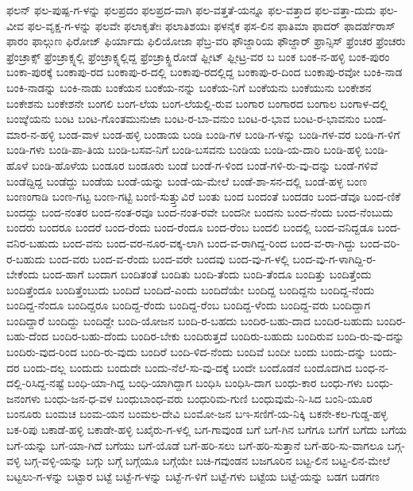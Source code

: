 ಫಲನ್
ಫಲ-ಪುಷ್ಪ-ಗ-ಳನ್ನು
ಫಲಪ್ರದಂ
ಫಲಪ್ರದ-ವಾಗಿ
ಫಲ-ವತ್ತತೆ-ಯನ್ನೂ
ಫಲ-ವತ್ತಾದ
ಫಲ-ವತ್ತಾ-ದುದು
ಫಲ-ವೀವ
ಫಲ-ವೃಕ್ಷ-ಗ-ಳನ್ನು
ಫಲವೇ
ಫಲಾಕೃತೇಃ
ಫಲಾತಿಶಯಃ
ಫಳನೈಕ
ಫಸ-ಲಿನ
ಫಾತಿಮಾ
ಫಾದರ್
ಫಾದರ್ಹೆರಾಸ್
ಫಾರಂ
ಫಾಲ್ಗುಣ
ಫಿರೋಜ್
ಫಿರ್ಯಾದು
ಫಿಲಿಯೋಜಾ
ಫೆಬ್ರ-ವರಿ
ಫೌಜ್ದಾರಿಯ
ಫೌಜ್ದಾರ್
ಫ್ರಾನ್ಸಿಸ್
ಫ್ರೆಂಚರ
ಫ್ರೆಂಚರು
ಫ್ರೆಂಚ್ರಾಕ್ಸ್
ಫ್ರೆಂಚ್ರಾಕ್ಸ್ನಲ್ಲಿ
ಫ್ರೆಂಚ್ರಾಕ್ಸ್ನಲ್ಲಿದ್ದ
ಫ್ರೆಂಚ್ರಾಕ್ಸ್ಹಿರೋಡೆ
ಫ್ಲೀಟ್
ಫ್ಲೀಟ್ರ-ವರ
ಬ
ಬಂಕ
ಬಂಕ-ನ-ಹಳ್ಳಿ
ಬಂಕ-ಪುರಂ
ಬಂಕಾ-ಪುರಕ್ಕೆ
ಬಂಕಾಪು-ರದ
ಬಂಕಾಪು-ರ-ದಲ್ಲಿ
ಬಂಕಾಪು-ರದಲ್ಲಿದ್ದ
ಬಂಕಾಪು-ರ-ದಿಂದ
ಬಂಕಾಪು-ರವೋ
ಬಂಕಿ-ನಾಡ
ಬಂಕಿ-ನಾಡನ್ನು
ಬಂಕಿ-ನಾಡು
ಬಂಕೆಯನ
ಬಂಕೆಯ-ನನ್ನು
ಬಂಕೆಯ-ನಿಗೆ
ಬಂಕೆಯನು
ಬಂಕೆಯುನು
ಬಂಕೇಶನ
ಬಂಕೇಶನು
ಬಂಕೇಶನೇ
ಬಂಗಲಿ
ಬಂಗ-ಲೆಯ
ಬಂಗ-ಲೆಯಲ್ಲಿ-ರುವ
ಬಂಗಾರ
ಬಂಗಾರದ
ಬಂಗಾಲ
ಬಂಗಾಳ-ದಲ್ಲಿ
ಬಂಙ್ಕೆಯನು
ಬಂಟ
ಬಂಟ-ಗೊಂತಮುನುಱಾ
ಬಂಟ-ರ-ಬಾ-ವನುಂ
ಬಂಟ-ರ-ಭಾವ
ಬಂಟ-ರ-ಭಾವನುಂ
ಬಂಡ-ಮಾರ-ನ-ಹಳ್ಳಿ
ಬಂಡ-ವಾಳ
ಬಂಡ-ಹಳ್ಳಿ
ಬಂಡಾಯ
ಬಂಡಿ
ಬಂಡಿ-ಗಳ
ಬಂಡಿ-ಗ-ಳನ್ನು
ಬಂಡಿ-ಗಳ-ವರ
ಬಂಡಿ-ಗ-ಳಿಗೆ
ಬಂಡಿ-ಗಳು
ಬಂಡಿ-ಪಾ-ತಿಯ
ಬಂಡಿ-ಬಸವ-ನಿಗೆ
ಬಂಡಿ-ಬಸವನು
ಬಂಡಿಯ
ಬಂಡಿ-ಯ-ದಾರಿ
ಬಂಡಿ-ಹಳ್ಳಿ
ಬಂಡಿ-ಹೊಳೆ
ಬಂಡಿ-ಹೊಳೆಯ
ಬಂಡೂರ
ಬಂಡೂರು
ಬಂಡೆ
ಬಂಡೆ-ಗ-ಳಿಂದ
ಬಂಡೆ-ಗಳಿ-ರು-ವು-ದನ್ನು
ಬಂಡೆ-ಗಳಿವೆ
ಬಂಡೆದ್ದಿದ್ದ
ಬಂಡೆದ್ದು
ಬಂಡೆಯ
ಬಂಡೆ-ಯನ್ನು
ಬಂಡೆ-ಯ-ಮೇಲೆ
ಬಂಡೆ-ಶಾ-ಸನ-ದಲ್ಲಿ
ಬಂಡೆ-ಹಳ್ಳ
ಬಂಣ
ಬಂಣಂಗಾಡಿ
ಬಂಣ-ಗಟ್ಟ
ಬಂಣ-ಗಟ್ಟಿ
ಬಂಣಿ-ಸುತ್ತ್ತುವಿರೆ
ಬಂತು
ಬಂದ
ಬಂದಂತೆ
ಬಂದಡಂ
ಬಂದ-ಡೆವೂ
ಬಂದ-ಣಿಕೆ
ಬಂದದ್ದು
ಬಂದ-ನಂತರ
ಬಂದ-ನಂತ-ರವೂ
ಬಂದ-ನಂತ-ರವೇ
ಬಂದನೀ
ಬಂದನು
ಬಂದ-ನೆಂದು
ಬಂದ-ನೆಂಬುದು
ಬಂದರು
ಬಂದರೂ
ಬಂದರೆ
ಬಂದ-ರೆಂದು
ಬಂದ-ರೆಂದೂ
ಬಂದ-ರೆಂಬ
ಬಂದಲಿ
ಬಂದಲ್ಲಿ
ಬಂದ-ವನಿದ್ದಡೂ
ಬಂದ-ವನಿರ-ಬಹುದು
ಬಂದ-ವನು
ಬಂದ-ವರ-ನೂರ-ವಕ್ಕ-ಲಾಗಿ
ಬಂದ-ವ-ರಾಗಿದ್ದ-ರಿಂದ
ಬಂದ-ವ-ರಾ-ಗಿದ್ದು
ಬಂದ-ವರಿ-ರ-ಬಹುದು
ಬಂದ-ವರು
ಬಂದ-ವ-ರೆಂದು
ಬಂದ-ವರೇ
ಬಂದವು
ಬಂದ-ವು-ಗ-ಳಲ್ಲಿ
ಬಂದ-ವು-ಗ-ಳಾಗಿದ್ದಿ-ರ-ಬೇಕೆಂದು
ಬಂದ-ಹಾಗೆ
ಬಂದಾಗ
ಬಂದಿತಂತೆ
ಬಂದಿತು
ಬಂದಿ-ತೆಂದು
ಬಂದಿ-ತೆಂದೂ
ಬಂದಿತ್ತು
ಬಂದಿತ್ತೆಂದು
ಬಂದಿತ್ತೆಂದೂ
ಬಂದಿತ್ತೆಂಬುದು
ಬಂದಿದೆ
ಬಂದಿದೆ-ಎಂದು
ಬಂದಿದೆಯೇ
ಬಂದಿದ್ದ
ಬಂದಿದ್ದನು
ಬಂದಿದ್ದ-ನೆಂದು
ಬಂದಿದ್ದ-ನೆಂದೂ
ಬಂದಿದ್ದರೂ
ಬಂದಿದ್ದ-ರೆಂದು
ಬಂದಿದ್ದ-ರೆಂಬ
ಬಂದಿದ್ದ-ಳೆಂದು
ಬಂದಿದ್ದ-ವರು
ಬಂದಿದ್ದಾಗ
ಬಂದಿದ್ದಾರೆ
ಬಂದಿದ್ದು
ಬಂದಿದ್ದೇ
ಬಂದಿ-ಯೋಜನ
ಬಂದಿ-ರ-ಬಹದು
ಬಂದಿರ-ಬಹು-ದಾದ
ಬಂದಿರ-ಬಹುದು
ಬಂದಿರ-ಬಹು-ದೆಂದ
ಬಂದಿರ-ಬಹು-ದೆಂದು
ಬಂದಿರ-ಬೇಕು
ಬಂದಿರುತ್ತದೆ
ಬಂದಿರು-ಬಹುದು
ಬಂದಿರುವ
ಬಂದಿ-ರು-ವು-ದನ್ನು
ಬಂದಿರು-ವುದ-ರಿಂದ
ಬಂದಿ-ರು-ವುದು
ಬಂದಿರೆ
ಬಂದಿ-ಳಿದ-ನೆಂದು
ಬಂದಿವೆ
ಬಂದೀ
ಬಂದು
ಬಂದು-ದನ್ನು
ಬಂದು-ದರ
ಬಂದು-ದಲ್ಲ
ಬಂದುದು
ಬಂದುದೇ
ಬಂದು-ನೆಲೆ-ಸು-ವು-ದಕ್ಕೆ
ಬಂದೇ
ಬಂದೊಡನೆ
ಬಂದೊದಗಿದ
ಬಂಧ-ನ-ದಲ್ಲಿ-ರಿಸಿದ್ದ-ನಷ್ಟೆ
ಬಂಧಿ-ಯಾ-ಗಿದ್ದ
ಬಂಧಿ-ಯಾಗಿದ್ದಾಗ
ಬಂಧಿಸಿ
ಬಂಧಿಸಿ-ದಾಗ
ಬಂಧು-ಕಾರ
ಬಂಧು-ಗಳು
ಬಂಧು-ಜನಂಗಳು
ಬಂಧು-ಜನ-ಧ-ವಳ
ಬಂಧುಬಾಂಧ-ವರು
ಬಂಧುರಿಮ-ಗುಣಿ
ಬಂಧುವುಮೆ-ನಿ-ಸಿದ
ಬಂನಿ-ಯೂರ
ಬಂನೂರು
ಬಂಮಚ
ಬಂಮ-ಯನ
ಬಂಮಲ-ದೇವಿ
ಬಂಮೋ-ಜನ
ಬಇ-ಸಣಿಗೆ-ಯ-ನಿಕ್ಕಿ
ಬಕನೇ-ಕಲ-ಗುಡ್ಡ-ಹಳ್ಳ
ಬಕ-ರಿಪು
ಬಕಾಡೆ-ಹಳ್ಳಿ
ಬಕಾಡೇ-ಹಳ್ಳಿ
ಬಖೈರು-ಗ-ಳಲ್ಲಿ
ಬಗ-ಗಾವುಂಡ
ಬಗೆ
ಬಗೆ-ಗಿನ
ಬಗೆಗೂ
ಬಗೆಗೆ
ಬಗೆದು
ಬಗೆಯ
ಬಗೆ-ಯನ್ನು
ಬಗೆ-ಯಾ-ಗಿದೆ
ಬಗೆಯು
ಬಗೆ-ಯೊಡೆ
ಬಗೆ-ಹರಿ-ಸಲು
ಬಗೆ-ಹರಿ-ಸುತ್ತಾನೆ
ಬಗೆ-ಹರಿ-ಸು-ವಾಗಲೂ
ಬಗ್ಗ-ವಳ್ಳಿ
ಬಗ್ಗ-ವಳ್ಳಿ-ಯನ್ನು
ಬಗ್ಗು
ಬಗ್ಗೆ
ಬಗ್ಗೆಯೂ
ಬಗ್ಗೆಯೇ
ಬಚಿ-ಗವುಂಡನ
ಬಜಗೂರಿನ
ಬಟ್ಟ-ಲಿನ
ಬಟ್ಟ-ಲಿನ-ಮೇಲೆ
ಬಟ್ಟಲು-ಗ-ಳನ್ನು
ಬಟ್ಟಾರ
ಬಟ್ಟೆ
ಬಟ್ಟೆ-ಗ-ಳನ್ನು
ಬಟ್ಟೆ-ಗ-ಳಿಗೆ
ಬಟ್ಟೆ-ಗಳು
ಬಟ್ಟೆಯ
ಬಟ್ಟೆ-ಯನ್ನು
ಬಡಗ
ಬಡಗಣ
